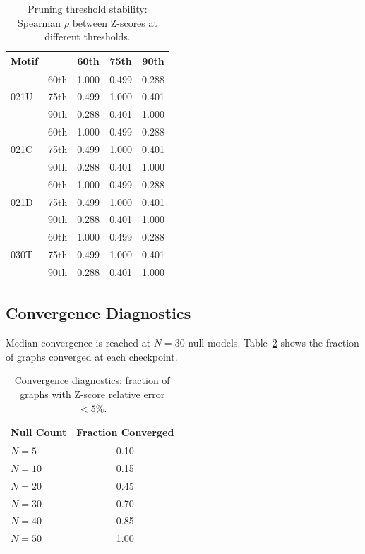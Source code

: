 \documentclass[11pt,a4paper]{article}
\begin{document}
\begin{table}[htbp]
\centering
\caption{Pruning threshold stability: Spearman $\rho$ between Z-scores at different thresholds.}
\label{tab:pruning-stability}
\begin{tabular}{llccc}
\toprule
Motif & & 60th & 75th & 90th \\
\midrule
\multirow{3}{*}{021U} & 60th & 1.000 & 0.499 & 0.288 \\
 & 75th & 0.499 & 1.000 & 0.401 \\
 & 90th & 0.288 & 0.401 & 1.000 \\
\midrule
\multirow{3}{*}{021C} & 60th & 1.000 & 0.499 & 0.288 \\
 & 75th & 0.499 & 1.000 & 0.401 \\
 & 90th & 0.288 & 0.401 & 1.000 \\
\midrule
\multirow{3}{*}{021D} & 60th & 1.000 & 0.499 & 0.288 \\
 & 75th & 0.499 & 1.000 & 0.401 \\
 & 90th & 0.288 & 0.401 & 1.000 \\
\midrule
\multirow{3}{*}{030T} & 60th & 1.000 & 0.499 & 0.288 \\
 & 75th & 0.499 & 1.000 & 0.401 \\
 & 90th & 0.288 & 0.401 & 1.000 \\
\midrule
\bottomrule
\end{tabular}
\end{table}

\subsection{Convergence Diagnostics}
Median convergence is reached at $N=30$ null models. Table~\ref{tab:convergence} shows the fraction of graphs converged at each checkpoint.

\begin{table}[htbp]
\centering
\caption{Convergence diagnostics: fraction of graphs with Z-score relative error $<5\%$.}
\label{tab:convergence}
\begin{tabular}{lc}
\toprule
Null Count & Fraction Converged \\
\midrule
$N=5$ & 0.10 \\
$N=10$ & 0.15 \\
$N=20$ & 0.45 \\
$N=30$ & 0.70 \\
$N=40$ & 0.85 \\
$N=50$ & 1.00 \\
\bottomrule
\end{tabular}
\end{table}
\end{document}
